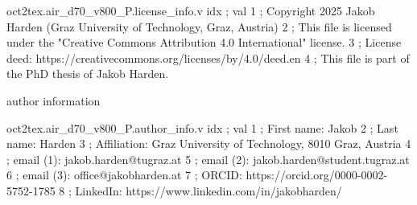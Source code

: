 \begin{filecontents}[overwrite]{oct2tex.air_d70_v800_P.license_info.v}
idx ; val
1 ; Copyright 2025 Jakob Harden (Graz University of Technology, Graz, Austria)
2 ; This file is licensed under the "Creative Commons Attribution 4.0 International" license.
3 ; License deed: https://creativecommons.org/licenses/by/4.0/deed.en
4 ; This file is part of the PhD thesis of Jakob Harden.
\end{filecontents}
\expandafter\def\csname oct2tex.air_d70_v800_P.author_info.d\endcsname{author information}
\begin{filecontents}[overwrite]{oct2tex.air_d70_v800_P.author_info.v}
idx ; val
1 ; First name: Jakob
2 ; Last name: Harden
3 ; Affiliation: Graz University of Technology, 8010 Graz, Austria
4 ; email (1): jakob.harden@tugraz.at
5 ; email (2): jakob.harden@student.tugraz.at
6 ; email (3): office@jakobharden.at
7 ; ORCID: https://orcid.org/0000-0002-5752-1785
8 ; LinkedIn: https://www.linkedin.com/in/jakobharden/
\end{filecontents}
